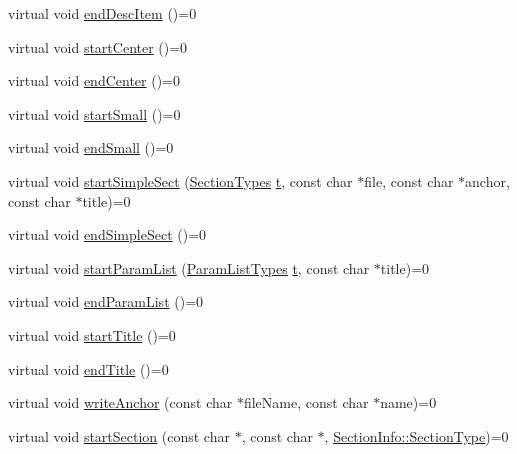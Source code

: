 \begin{DoxyCompactItemize}
virtual void \hyperlink{class_base_output_doc_interface_a09e3aa9d3faac55b2cc9290eaa69f55b}{end\+Desc\+Item} ()=0
\item 
virtual void \hyperlink{class_base_output_doc_interface_af7740896d897da2924e8d8818858edd1}{start\+Center} ()=0
\item 
virtual void \hyperlink{class_base_output_doc_interface_aacbcdb867519fce8db354460566aa4ea}{end\+Center} ()=0
\item 
virtual void \hyperlink{class_base_output_doc_interface_aa48fb5d720aabf2dc67d866b9861f733}{start\+Small} ()=0
\item 
virtual void \hyperlink{class_base_output_doc_interface_aece1c56c3a382b5e7228f034e600b43f}{end\+Small} ()=0
\item 
virtual void \hyperlink{class_base_output_doc_interface_aa70bb07889b548a670a5b30f53fd8046}{start\+Simple\+Sect} (\hyperlink{class_base_output_doc_interface_a07a3d5df76a714674e070e5e236fe886}{Section\+Types} \hyperlink{058__bracket__recursion_8tcl_a69e959f6901827e4d8271aeaa5fba0fc}{t}, const char $\ast$file, const char $\ast$anchor, const char $\ast$title)=0
\item 
virtual void \hyperlink{class_base_output_doc_interface_a4519107f922ba406e50b84a2a6b274b7}{end\+Simple\+Sect} ()=0
\item 
virtual void \hyperlink{class_base_output_doc_interface_a0fe360d170bf70af8455d521ecad8cab}{start\+Param\+List} (\hyperlink{class_base_output_doc_interface_a944ed4d9fb389999c2724eeb321b8c8c}{Param\+List\+Types} \hyperlink{058__bracket__recursion_8tcl_a69e959f6901827e4d8271aeaa5fba0fc}{t}, const char $\ast$title)=0
\item 
virtual void \hyperlink{class_base_output_doc_interface_a2e18469ef7e3f144e05d7713efaa9aac}{end\+Param\+List} ()=0
\item 
virtual void \hyperlink{class_base_output_doc_interface_a52507f4f611800062e6776704d3c0eaf}{start\+Title} ()=0
\item 
virtual void \hyperlink{class_base_output_doc_interface_a5dee56a3a18bafb23c30f42e6575210f}{end\+Title} ()=0
\item 
virtual void \hyperlink{class_base_output_doc_interface_a02ec04af87e175323ad789347884c896}{write\+Anchor} (const char $\ast$file\+Name, const char $\ast$name)=0
\item 
virtual void \hyperlink{class_base_output_doc_interface_a820f65539d9328cfafe23a2542375853}{start\+Section} (const char $\ast$, const char $\ast$, \hyperlink{struct_section_info_a32308f52dd59422b14fb75a92c90ebf1}{Section\+Info\+::\+Section\+Type})=0

\end{DoxyCompactItemize}

